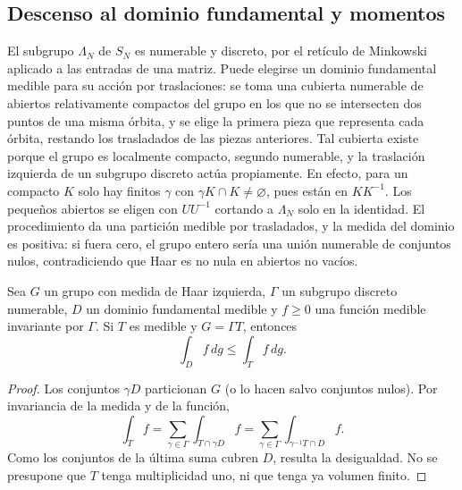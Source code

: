 \subsection{Descenso al dominio fundamental y momentos}

El subgrupo $\Lambda_N$ de $S_N$ es numerable y discreto, por el retículo de Minkowski aplicado a las entradas de una matriz. Puede elegirse un dominio fundamental medible para su acción por traslaciones: se toma una cubierta numerable de abiertos relativamente compactos del grupo en los que no se intersecten dos puntos de una misma órbita, y se elige la primera pieza que representa cada órbita, restando los trasladados de las piezas anteriores. Tal cubierta existe porque el grupo es localmente compacto, segundo numerable, y la traslación izquierda de un subgrupo discreto actúa propiamente. En efecto, para un compacto $K$ solo hay finitos $\gamma$ con $\gamma K\cap K\ne\varnothing$, pues están en $KK^{-1}$. Los pequeños abiertos se eligen con $UU^{-1}$ cortando a $\Lambda_N$ solo en la identidad. El procedimiento da una partición medible por trasladados, y la medida del dominio es positiva: si fuera cero, el grupo entero sería una unión numerable de conjuntos nulos, contradiciendo que Haar es no nula en abiertos no vacíos.

\begin{lema}
\label{lem:ahr-coverint}
Sea $G$ un grupo con medida de Haar izquierda, $\Gamma$ un subgrupo discreto numerable, $D$ un dominio fundamental medible y $f\ge0$ una función medible invariante por $\Gamma$. Si $T$ es medible y $G=\Gamma T$, entonces
\[
 \int_D f\,dg\le\int_T f\,dg.
\]
\end{lema}
\begin{proof}
Los conjuntos $\gamma D$ particionan $G$ (o lo hacen salvo conjuntos nulos). Por invariancia de la medida y de la función,
\[
 \int_T f=\sum_{\gamma\in\Gamma}\int_{T\cap\gamma D} f
         =\sum_{\gamma\in\Gamma}\int_{\gamma^{-1}T\cap D} f.
\]
Como los conjuntos de la última suma cubren $D$, resulta la desigualdad. No se presupone que $T$ tenga multiplicidad uno, ni que tenga ya volumen finito.
\end{proof}

